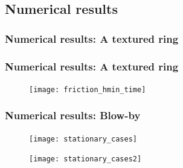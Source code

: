 \documentclass[10pt,aspectratio=169]{beamer}
\begin{document}
\subsection{Numerical results}
\begin{frame}
\tableofcontents[
currentsection,
currentsubsection,
subsectionstyle=show/shaded/hide
]
\end{frame}
\begin{frame}
\frametitle{Numerical results: A textured ring}\vspace*{0.5cm}
\begin{center}
\begin{minipage}{0.9\textwidth}
	\centering 
\end{minipage}
\end{center}

\end{frame}


\begin{frame}
\frametitle{Numerical results: A textured ring}
\vspace*{1.0cm}
\begin{figure}
	\centering
	\texttt{[image: friction\_hmin\_time]}
\end{figure}
\end{frame}

\begin{frame}
\frametitle{Numerical results: Blow-by}
\vspace*{1.0cm}
\begin{minipage}{0.5\textwidth}
	\begin{figure}
		\texttt{[image: stationary\_cases]}
	\end{figure}
\end{minipage}%
\begin{minipage}{0.5\textwidth}
	\begin{figure}
		\texttt{[image: stationary\_cases2]}
	\end{figure}
\end{minipage}

\end{frame}
\end{document}
